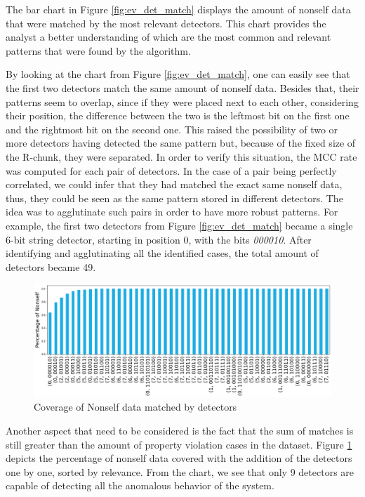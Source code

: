 The bar chart in Figure \ref{fig:ev_det_match} displays the amount of nonself data that were matched by the most relevant detectors. This chart provides the analyst a better understanding of which are the most common and relevant patterns that were found by the algorithm.

By looking at the chart from Figure \ref{fig:ev_det_match}, one can easily see that the first two detectors match the same amount of nonself data. Besides that, their patterns seem to overlap, since if they were placed next to each other, considering their position, the difference between the two is the leftmost bit on the first one and the rightmost bit on the second one. This raised the possibility of two or more detectors having detected the same pattern but, because of the fixed size of the R-chunk, they were separated. In order to verify this situation, the MCC rate was computed for each pair of detectors. In the case of a pair being perfectly correlated, we could infer that they had matched the exact same nonself data, thus, they could be seen as the same pattern stored in different detectors. The idea was to agglutinate such pairs in order to have more robust patterns. For example, the first two detectors from Figure \ref{fig:ev_det_match} became a single 6-bit string detector, starting in position 0, with the bits \textit{000010}. After identifying and agglutinating all the identified cases, the total amount of detectors became 49.

\begin{figure}[]
	\centering
	\includegraphics[width=\textwidth, keepaspectratio]{img/det_coverage.png}
	\caption{Coverage of Nonself data matched by detectors}
	\label{fig:ev_det_cov}
\end{figure}

Another aspect that need to be considered is the fact that the sum of matches is still greater than the amount of property violation cases in the dataset. Figure \ref{fig:ev_det_cov} depicts the percentage of nonself data covered with the addition of the detectors one by one, sorted by relevance. From the chart, we see that only 9 detectors are capable of detecting all the anomalous behavior of the system. 

